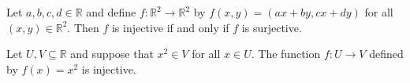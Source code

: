 \begin{chapex} %
Let $a,b,c,d \in \mathbb{R}$ and define $f : \mathbb{R}^2 \to \mathbb{R}^2$ by $f(x,y) = (ax+by,cx+dy)$ for all $(x,y) \in \mathbb{R}^2$. Then $f$ is injective if and only if $f$ is surjective.
\end{chapex}

\begin{chapex} %
\label{cqFunctionsASNEnd}
Let $U, V \subseteq \mathbb{R}$ and suppose that $x^2 \in V$ for all $x \in U$. The function $f : U \to V$ defined by $f(x) = x^2$ is injective.
\end{chapex}